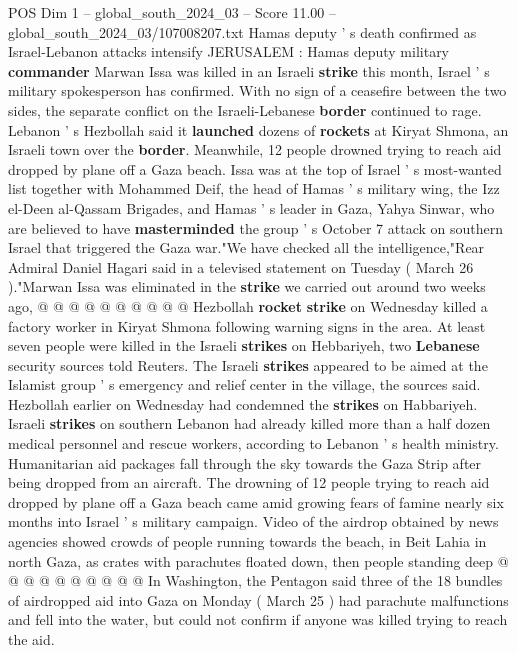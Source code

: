 \begin{textsample}{POS Dim 1 – global\_south\_2024\_03 – Score 11.00 – global\_south\_2024\_03/107008207.txt}  \label{ex:f1_pos_350}
Hamas deputy ' s death confirmed as Israel-Lebanon attacks intensify JERUSALEM : Hamas deputy military \textbf{commander} Marwan Issa was killed in an Israeli \textbf{strike} this month, Israel ' s military spokesperson has confirmed.
With no sign of a ceasefire between the two sides, the separate conflict on the Israeli-Lebanese \textbf{border} continued to rage.
Lebanon ' s Hezbollah said it \textbf{launched} dozens of \textbf{rockets} at Kiryat Shmona, an Israeli town over the \textbf{border}.
Meanwhile, 12 people drowned trying to reach aid dropped by plane off a Gaza beach.
Issa was at the top of Israel ' s most-wanted list together with Mohammed Deif, the head of Hamas ' s military wing, the Izz el-Deen al-Qassam Brigades, and Hamas ' s leader in Gaza, Yahya Sinwar, who are believed to have \textbf{masterminded} the group ' s October 7 attack on southern Israel that triggered the Gaza war."We have checked all the intelligence,"Rear Admiral Daniel Hagari said in a televised statement on Tuesday ( March 26 )."Marwan Issa was eliminated in the \textbf{strike} we carried out around two weeks ago, @ @ @ @ @ @ @ @ @ @ Hezbollah \textbf{rocket} \textbf{strike} on Wednesday killed a factory worker in Kiryat Shmona following warning signs in the area.
At least seven people were killed in the Israeli \textbf{strikes} on Hebbariyeh, two \textbf{Lebanese} security sources told Reuters.
The Israeli \textbf{strikes} appeared to be aimed at the Islamist group ' s emergency and relief center in the village, the sources said.
Hezbollah earlier on Wednesday had condemned the \textbf{strikes} on Habbariyeh.
Israeli \textbf{strikes} on southern Lebanon had already killed more than a half dozen medical personnel and rescue workers, according to Lebanon ' s health ministry.
Humanitarian aid packages fall through the sky towards the Gaza Strip after being dropped from an aircraft.
The drowning of 12 people trying to reach aid dropped by plane off a Gaza beach came amid growing fears of famine nearly six months into Israel ' s military campaign.
Video of the airdrop obtained by news agencies showed crowds of people running towards the beach, in Beit Lahia in north Gaza, as crates with parachutes floated down, then people standing deep @ @ @ @ @ @ @ @ @ @ In Washington, the Pentagon said three of the 18 bundles of airdropped aid into Gaza on Monday ( March 25 ) had parachute malfunctions and fell into the water, but could not confirm if anyone was killed trying to reach the aid.

\end{textsample}
